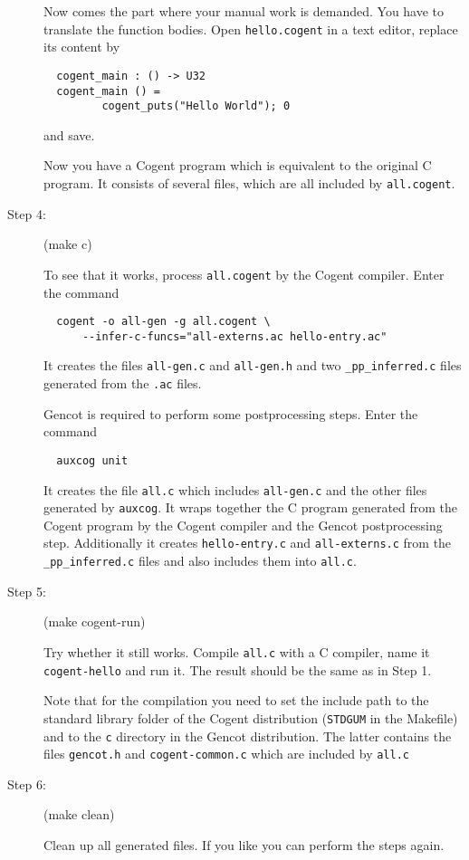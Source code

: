 \documentclass[a4paper]{report}
\newcommand{\code}[1]{\textnormal{\texttt{#1}}}
\begin{document}
\begin{description}
Now comes the part where your manual work is demanded. You have to translate the function bodies.
Open \code{hello.cogent} in a text editor, replace its content by
\begin{verbatim}
  cogent_main : () -> U32
  cogent_main () =
         cogent_puts("Hello World"); 0
\end{verbatim}
and save. 

Now you have a Cogent program which is equivalent to the original C program. It consists of several files,
which are all included by \code{all.cogent}.

\item[Step 4:] (make c)

To see that it works, process \code{all.cogent} by the Cogent compiler. Enter the command
\begin{verbatim}
  cogent -o all-gen -g all.cogent \
      --infer-c-funcs="all-externs.ac hello-entry.ac"
\end{verbatim}
It creates the files \code{all-gen.c} and \code{all-gen.h} and two \code{\_pp\_inferred.c} files generated from 
the \code{.ac} files. 

Gencot is required to perform some postprocessing steps. Enter the command
\begin{verbatim}
  auxcog unit
\end{verbatim}
It creates the file \code{all.c} which includes \code{all-gen.c} and the other files generated by \code{auxcog}. It wraps together 
the C program generated from the Cogent program by the Cogent compiler and the Gencot postprocessing step. Additionally
it creates \code{hello-entry.c} and \code{all-externs.c} from the \code{\_pp\_inferred.c} files and also includes them
into \code{all.c}.

\item[Step 5:] (make cogent-run)

Try whether it still works. Compile \code{all.c} with a C compiler, name it \code{cogent-hello} and run it. The result should be the same
as in Step 1.

Note that for the compilation you need to set the include path to the standard library folder of the Cogent 
distribution (\code{STDGUM} in the Makefile) and to the \code{c} directory in the Gencot distribution. The latter contains the files
\code{gencot.h} and \code{cogent-common.c} which are included by \code{all.c}

\item[Step 6:] (make clean)

Clean up all generated files. If you like you can perform the steps again.
\end{description}
\end{document}
